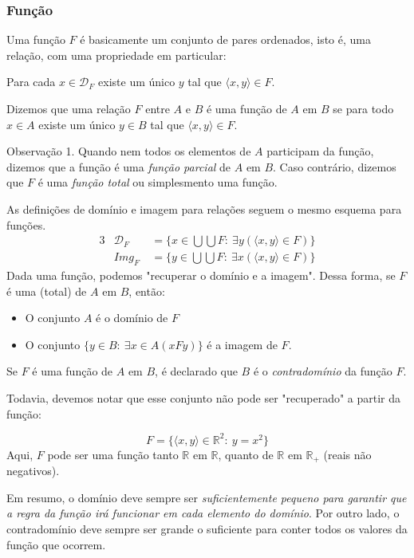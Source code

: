 \subsubsection{Função}
Uma função $F$ é basicamente um conjunto de pares ordenados, isto é, uma relação, com uma propriedade em particular:
\begin{stat}
  Para cada $x \in \mathcal{D}_{F}$ existe um único $y$ tal que $\langle x, y \rangle \in F.$
\end{stat}
\begin{definition}
  Dizemos que uma relação $F$ entre $A$ e $B$ é uma função de $A$ em $B$ se para todo $x \in A$ existe um único $y \in B$ tal que $\langle x, y \rangle \in F.$ 
\end{definition}
\begin{mymdframed}{Observação 1.}
  Quando nem todos os elementos de $A$ participam da função, dizemos que a função é uma \textit{função parcial} de $A$ em $B$. Caso contrário, dizemos que $F$ é uma \textit{função total} ou simplesmento uma função.
\end{mymdframed}
As definições de domínio e imagem para relações seguem o mesmo esquema para funções.
\begin{alignat*}{3}
  & \mathcal{D}_{F}& \ = \{x \in \bigcup \bigcup F:\ \exists y (\langle x, y \rangle \in F) \}\\
  & \mathit{Img}_{F}& \ = \{y \in \bigcup \bigcup F:\ \exists x (\langle x, y \rangle \in F)\}
\end{alignat*}
Dada uma função, podemos "recuperar o domínio e a imagem". Dessa forma, se $F$ é uma (total) de $A$ em $B$, então:
\begin{itemize}
  \item O conjunto $A$ é o domínio de $F$
  \item O conjunto $\{y \in B:\ \exists x \in A(xFy)\}$ é a imagem de $F.$
\end{itemize}
\newpage

\begin{definition}[Contradomínio]
  Se $F$ é uma função de $A$ em $B$, é declarado que $B$ é o \textit{contradomínio} da função $F$.  
\end{definition}
Todavia, devemos notar que esse conjunto não pode ser "recuperado" a partir da função:
\begin{exmp}
  $$F = \{\langle x, y \rangle \in \mathbb{R}^{2}:\ y = x^{2}\}$$
  Aqui, $F$ pode ser uma função tanto $\mathbb{R}$ em $\mathbb{R}$, quanto de $\mathbb{R}$ em $\mathbb{R}_{+}$ (reais não negativos).
\end{exmp}
Em resumo, o domínio deve sempre ser \emph{suficientemente pequeno para garantir que a regra da função irá funcionar em cada elemento do domínio}. Por outro lado, o contradomínio deve sempre ser grande o suficiente para conter todos os valores da função que ocorrem.


